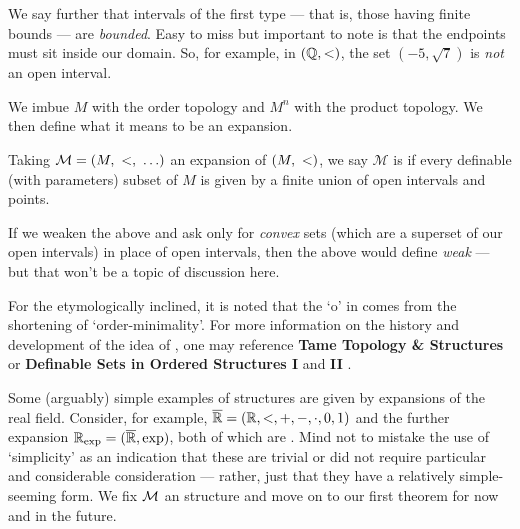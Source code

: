 We say further that intervals of the first type — that is, those having finite bounds — are \emph{bounded}. Easy to miss but important to note is that the endpoints must sit inside our domain. So, for example, in $(\mathbb{Q}, <)$, the set $(-5, \sqrt{7})$ is \emph{not} an open interval.

We imbue $M$ with the order topology and $M^n$ with the product topology. We then define what it means to be an \om expansion.

\begin{definition}[\Om expansion]
  Taking $\mathcal{M} = (M, \ <, \ \hdots)$ an expansion of $(M, \ <)$, we say $\mathcal{M}$ is \om if every definable (with parameters) subset of $M$ is given by a finite union of open intervals and points.
\end{definition}

\begin{svgraybox}
  If we weaken the above and ask only for \emph{convex} sets (which are a superset of our open intervals) in place of open intervals, then the above would define \emph{weak \omy} — but that won't be a topic of discussion here.
\end{svgraybox}

For the etymologically inclined, it is noted that the `o' in \om comes from the shortening of `order-minimality'. For more information on the history and development of the idea of \omy, one may reference
\textbf{Tame Topology \& \Om Structures} \cite{dries_tame_1998} or \textbf{Definable Sets in Ordered Structures I} \cite{pillay_definable_1986} and \textbf{II} \cite{knight_definable_1986}.


Some (arguably) simple examples of \om structures are given by expansions of the real field. Consider, for example, $\overline{\mathbb{R}} = (\mathbb{R}, <, +, -, \cdot, 0, 1)$ and the further expansion $\mathbb{R}_{\textrm{exp}} = (\overline{\mathbb{R}}, \exp)$, both of which are \om. Mind not to mistake the use of `simplicity' as an indication that these are trivial or did not require particular and considerable consideration — rather, just that they have a relatively simple-seeming form. We fix $\mathcal{M}$ an \om structure and move on to our first theorem for now and in the future.
